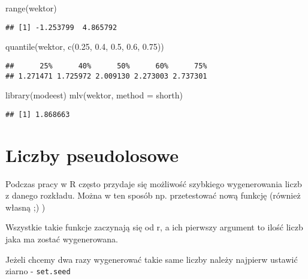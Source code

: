 \documentclass[
]{book}
\newenvironment{Shaded}{\begin{snugshade}}{\end{snugshade}}
\newcommand{\AttributeTok}[1]{\textcolor[rgb]{0.77,0.63,0.00}{#1}}
\newcommand{\FloatTok}[1]{\textcolor[rgb]{0.00,0.00,0.81}{#1}}
\newcommand{\FunctionTok}[1]{\textcolor[rgb]{0.00,0.00,0.00}{#1}}
\newcommand{\NormalTok}[1]{#1}
\newcommand{\StringTok}[1]{\textcolor[rgb]{0.31,0.60,0.02}{#1}}
\begin{document}
\begin{Shaded}
\begin{Highlighting}[]
\FunctionTok{range}\NormalTok{(wektor)}
\end{Highlighting}
\end{Shaded}

\begin{verbatim}
## [1] -1.253799  4.865792
\end{verbatim}

\begin{Shaded}
\begin{Highlighting}[]
\FunctionTok{quantile}\NormalTok{(wektor, }\FunctionTok{c}\NormalTok{(}\FloatTok{0.25}\NormalTok{, }\FloatTok{0.4}\NormalTok{, }\FloatTok{0.5}\NormalTok{, }\FloatTok{0.6}\NormalTok{, }\FloatTok{0.75}\NormalTok{))}
\end{Highlighting}
\end{Shaded}

\begin{verbatim}
##      25%      40%      50%      60%      75% 
## 1.271471 1.725972 2.009130 2.273003 2.737301
\end{verbatim}

\begin{Shaded}
\begin{Highlighting}[]
\FunctionTok{library}\NormalTok{(modeest)}
\FunctionTok{mlv}\NormalTok{(wektor, }\AttributeTok{method =} \StringTok{\textquotesingle{}shorth\textquotesingle{}}\NormalTok{)}
\end{Highlighting}
\end{Shaded}

\begin{verbatim}
## [1] 1.868663
\end{verbatim}

\hypertarget{liczby-pseudolosowe}{%
\section{Liczby pseudolosowe}\label{liczby-pseudolosowe}}

Podczas pracy w R często przydaje się możliwość szybkiego wygenerowania liczb z danego rozkładu. Można w ten sposób np. przetestować nową funkcję (również własną ;) )

Wszystkie takie funkcje zaczynają się od r, a ich pierwszy argument to ilość liczb jaka ma zostać wygenerowana.

Jeżeli chcemy dwa razy wygenerować takie same liczby należy najpierw ustawić ziarno - \texttt{set.seed}
\end{document}
